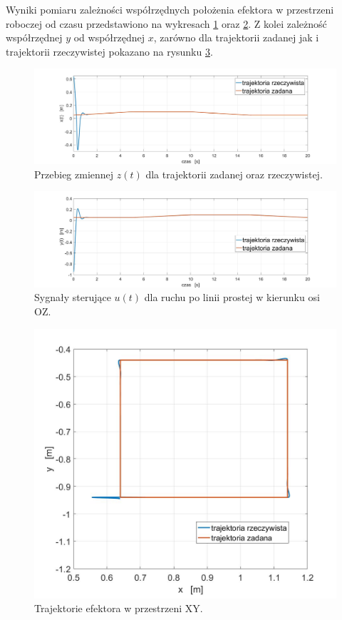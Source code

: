 \documentclass[eng,printmode]{mgr}
\begin{document}
Wyniki pomiaru zależności współrzędnych położenia efektora w przestrzeni roboczej od czasu przedstawiono na wykresach \ref{kwx} oraz \ref{kwy}. Z kolei zależność współrzędnej $y$ od współrzędnej $x$, zarówno dla trajektorii zadanej jak i trajektorii rzeczywistej pokazano na rysunku \ref{kwxy}.
\hfill \break
\begin{figure}[!h]
\centering
\includegraphics[width=1\textwidth]{kwx.jpg}
\caption{\label{kwx}Przebieg zmiennej $z(t)$ dla trajektorii zadanej oraz rzeczywistej.}
\end{figure}
\begin{figure}[!h]
\centering
\includegraphics[width=1\textwidth]{kwy.jpg}
\caption{\label{kwy}Sygnały sterujące $u(t)$ dla ruchu po linii prostej w kierunku osi OZ.}
\end{figure}
\begin{figure}[!h]
\centering
\includegraphics[width=1\textwidth]{kwxy.jpg}
\caption{\label{kwxy}Trajektorie efektora w przestrzeni XY.}
\end{figure}
\end{document}
